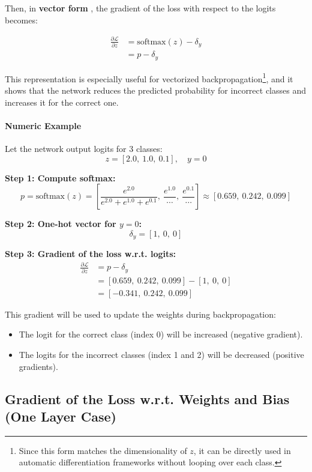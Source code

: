 Then, in \textbf{vector form} , the gradient of the loss with respect to the logits becomes:

\begin{align}
	\frac{\partial \mathcal{L}}{\partial z} &= \text{softmax}(z) - \delta_y \\ 
	&= p - \delta_y
\end{align}

\noindent This representation is especially useful for vectorized backpropagation\footnote{Since this form matches the dimensionality of $z$, it can be directly used in automatic differentiation frameworks without looping over each class.}, and it shows that the network reduces the predicted probability for incorrect classes and increases it for the correct one.



\paragraph{Numeric Example}

Let the network output logits for 3 classes:
\[
z = [2.0,\ 1.0,\ 0.1], \quad y = 0
\]

\textbf{Step 1: Compute softmax:}
\[
p = \text{softmax}(z) = 
\left[
\frac{e^{2.0}}{e^{2.0} + e^{1.0} + e^{0.1}},\ 
\frac{e^{1.0}}{\cdots},\ 
\frac{e^{0.1}}{\cdots}
\right]
\approx [0.659,\ 0.242,\ 0.099]
\]

\textbf{Step 2: One-hot vector for $y = 0$:}
\[
\delta_y = [1,\ 0,\ 0]
\]

\textbf{Step 3: Gradient of the loss w.r.t. logits:}
\begin{align}
\frac{\partial \mathcal{L}}{\partial z}
&= p - \delta_y \\
&= [0.659,\ 0.242,\ 0.099] - [1,\ 0,\ 0] \\
&= [-0.341,\ 0.242,\ 0.099]
\end{align}

This gradient will be used to update the weights during backpropagation:
\begin{itemize}
	\item The logit for the correct class (index 0) will be increased (negative gradient).
	\item The logits for the incorrect classes (index 1 and 2) will be decreased (positive gradients).
\end{itemize}

\subsection*{Gradient of the Loss w.r.t. Weights and Bias (One Layer Case)}

